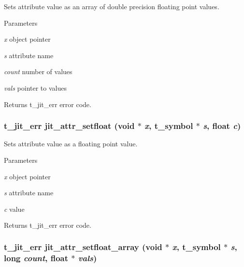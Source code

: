 Sets attribute value as an array of double precision floating point values. 
\begin{DoxyParams}{Parameters}
\item[{\em x}]object pointer \item[{\em s}]attribute name \item[{\em count}]number of values \item[{\em vals}]pointer to values\end{DoxyParams}
\begin{DoxyReturn}{Returns}
t\_\-jit\_\-err error code. 
\end{DoxyReturn}
\hypertarget{group__attrmod_gab30940565548004a6d2d48562aa2bc20}{
\subsubsection[{jit\_\-attr\_\-setfloat}]{\setlength{\rightskip}{0pt plus 5cm}t\_\-jit\_\-err jit\_\-attr\_\-setfloat (void $\ast$ {\em x}, \/  {\bf t\_\-symbol} $\ast$ {\em s}, \/  float {\em c})}}
\label{group__attrmod_gab30940565548004a6d2d48562aa2bc20}


Sets attribute value as a floating point value. 
\begin{DoxyParams}{Parameters}
\item[{\em x}]object pointer \item[{\em s}]attribute name \item[{\em c}]value\end{DoxyParams}
\begin{DoxyReturn}{Returns}
t\_\-jit\_\-err error code. 
\end{DoxyReturn}
\hypertarget{group__attrmod_gad1b9ac91879b07c1c054e90e1afef5c0}{
\subsubsection[{jit\_\-attr\_\-setfloat\_\-array}]{\setlength{\rightskip}{0pt plus 5cm}t\_\-jit\_\-err jit\_\-attr\_\-setfloat\_\-array (void $\ast$ {\em x}, \/  {\bf t\_\-symbol} $\ast$ {\em s}, \/  long {\em count}, \/  float $\ast$ {\em vals})}}
\label{group__attrmod_gad1b9ac91879b07c1c054e90e1afef5c0}


